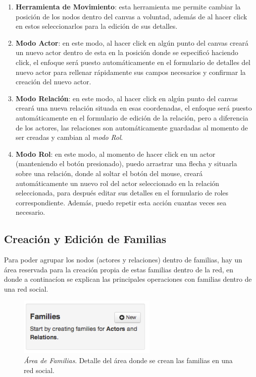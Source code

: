   \begin{enumerate}
    \item \textbf{Herramienta de Movimiento}: esta herramienta me permite cambiar la posición de los nodos dentro del canvas a voluntad, además de al hacer click en estos seleccionarlos para la edición de sus detalles.
    \item \textbf{Modo Actor}: en este modo, al hacer click en algún punto del canvas creará un nuevo actor dentro de esta en la posición donde se especificó haciendo click, el enfoque será puesto automáticamente en el formulario de detalles del nuevo actor para rellenar rápidamente sus campos necesarios y confirmar la creación del nuevo actor.
    \item \textbf{Modo Relación}: en este modo, al hacer click en algún punto del canvas creará una nueva relación situada en esas coordenadas, el enfoque será puesto automáticamente en el formulario de edición de la relación, pero a diferencia de los actores, las relaciones son automáticamente guardadas al momento de ser creadas y cambian al \emph{modo Rol}.
    \item \textbf{Modo Rol}: en este modo, al momento de hacer click en un actor (manteniendo el botón presionado), puedo arrastrar una flecha y situarla sobre una relación, donde al soltar el botón del mouse, creará automáticamente un nuevo rol del actor seleccionado en la relación seleccionada, para después editar sus detalles en el formulario de roles correspondiente. Además, puedo repetir esta acción cuantas veces sea necesario.
  \end{enumerate}



\subsection{Creación y Edición de Familias} %
\label{sub:creacion_y_edicion_de_familias}

Para poder agrupar los nodos (actores y relaciones) dentro de familias, hay un área reservada para la creación propia de estas familias dentro de la red, en donde a continacíon se explican las principales operaciones con familias dentro de una red social.\\

\begin{figure}[H]
  \centering
  \includegraphics[width=0.6\textwidth]{images/area_familias.png}
  \caption[Área de Familias]{\emph{Área de Familias}. Detalle del área donde se crean las familias en una red social.}
  \label{area_familias}
\end{figure}

